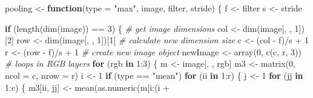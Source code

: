 \documentclass[
  12pt,
]{krantz}
\makeatletter
\newenvironment{Shaded}{\begin{snugshade}}{\end{snugshade}}
\newcommand{\AttributeTok}[1]{\textcolor[rgb]{0.61,0.61,0.61}{#1}}
\newcommand{\CommentTok}[1]{\textcolor[rgb]{0.37,0.37,0.37}{\textit{#1}}}
\newcommand{\ControlFlowTok}[1]{\textcolor[rgb]{0.27,0.27,0.27}{\textbf{#1}}}
\newcommand{\DecValTok}[1]{\textcolor[rgb]{0.06,0.06,0.06}{#1}}
\newcommand{\FunctionTok}[1]{\textcolor[rgb]{0,0,0}{#1}}
\newcommand{\NormalTok}[1]{#1}
\newcommand{\OtherTok}[1]{\textcolor[rgb]{0.37,0.37,0.37}{#1}}
\newcommand{\SpecialCharTok}[1]{\textcolor[rgb]{0,0,0}{#1}}
\newcommand{\StringTok}[1]{\textcolor[rgb]{0.5,0.5,0.5}{#1}}
\newenvironment{kframe}{%
\medskip{}
\setlength{\fboxsep}{.8em}
 \def\at@end@of@kframe{}%
 \ifinner\ifhmode%
  \def\at@end@of@kframe{\end{minipage}}%
  \begin{minipage}{\columnwidth}%
 \fi\fi%
 \def\FrameCommand##1{\hskip\@totalleftmargin \hskip-\fboxsep
 \colorbox{shadecolor}{##1}\hskip-\fboxsep
     \hskip-\linewidth \hskip-\@totalleftmargin \hskip\columnwidth}%
 \MakeFramed {\advance\hsize-\width
   \@totalleftmargin\z@ \linewidth\hsize
   \@setminipage}}%
 {\par\unskip\endMakeFramed%
 \at@end@of@kframe}
\renewenvironment{Shaded}{\begin{kframe}}{\end{kframe}}
\makeatother
\begin{document}
\begin{Shaded}
\begin{Highlighting}[]
\NormalTok{pooling }\OtherTok{\textless{}{-}} \ControlFlowTok{function}\NormalTok{(}\AttributeTok{type =} \StringTok{"max"}\NormalTok{, image, filter, stride) \{}
\NormalTok{    f }\OtherTok{\textless{}{-}}\NormalTok{ filter}
\NormalTok{    s }\OtherTok{\textless{}{-}}\NormalTok{ stride}
    
    \ControlFlowTok{if}\NormalTok{ (}\FunctionTok{length}\NormalTok{(}\FunctionTok{dim}\NormalTok{(image)) }\SpecialCharTok{==} \DecValTok{3}\NormalTok{) \{}
        \CommentTok{\# get image dimensions}
\NormalTok{        col }\OtherTok{\textless{}{-}} \FunctionTok{dim}\NormalTok{(image[, , }\DecValTok{1}\NormalTok{])[}\DecValTok{2}\NormalTok{]}
\NormalTok{        row }\OtherTok{\textless{}{-}} \FunctionTok{dim}\NormalTok{(image[, , }\DecValTok{1}\NormalTok{])[}\DecValTok{1}\NormalTok{]}
        \CommentTok{\# calculate new dimension size}
\NormalTok{        c }\OtherTok{\textless{}{-}}\NormalTok{ (col }\SpecialCharTok{{-}}\NormalTok{ f)}\SpecialCharTok{/}\NormalTok{s }\SpecialCharTok{+} \DecValTok{1}
\NormalTok{        r }\OtherTok{\textless{}{-}}\NormalTok{ (row }\SpecialCharTok{{-}}\NormalTok{ f)}\SpecialCharTok{/}\NormalTok{s }\SpecialCharTok{+} \DecValTok{1}
        \CommentTok{\# create new image object}
\NormalTok{        newImage }\OtherTok{\textless{}{-}} \FunctionTok{array}\NormalTok{(}\DecValTok{0}\NormalTok{, }\FunctionTok{c}\NormalTok{(c, r, }\DecValTok{3}\NormalTok{))}
        \CommentTok{\# loops in RGB layers}
        \ControlFlowTok{for}\NormalTok{ (rgb }\ControlFlowTok{in} \DecValTok{1}\SpecialCharTok{:}\DecValTok{3}\NormalTok{) \{}
\NormalTok{            m }\OtherTok{\textless{}{-}}\NormalTok{ image[, , rgb]}
\NormalTok{            m3 }\OtherTok{\textless{}{-}} \FunctionTok{matrix}\NormalTok{(}\DecValTok{0}\NormalTok{, }\AttributeTok{ncol =}\NormalTok{ c, }\AttributeTok{nrow =}\NormalTok{ r)}
\NormalTok{            i }\OtherTok{\textless{}{-}} \DecValTok{1}
            \ControlFlowTok{if}\NormalTok{ (type }\SpecialCharTok{==} \StringTok{"mean"}\NormalTok{) }
                \ControlFlowTok{for}\NormalTok{ (ii }\ControlFlowTok{in} \DecValTok{1}\SpecialCharTok{:}\NormalTok{r) \{}
\NormalTok{                  j }\OtherTok{\textless{}{-}} \DecValTok{1}
                  \ControlFlowTok{for}\NormalTok{ (jj }\ControlFlowTok{in} \DecValTok{1}\SpecialCharTok{:}\NormalTok{c) \{}
\NormalTok{                    m3[ii, jj] }\OtherTok{\textless{}{-}} \FunctionTok{mean}\NormalTok{(}\FunctionTok{as.numeric}\NormalTok{(m[i}\SpecialCharTok{:}\NormalTok{(i }\SpecialCharTok{+} 

\end{Highlighting}
\end{Shaded}
\end{document}
